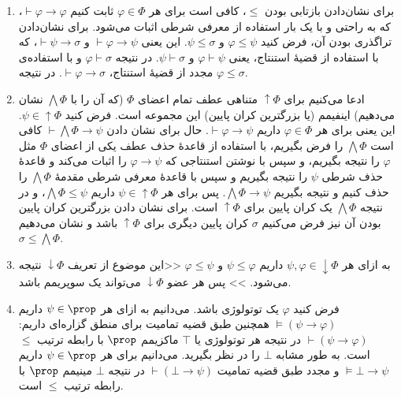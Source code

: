 \begin{ans}
    \begin{enumerate}[label=(\alph*)]
        \item\label{q60:a} برای نشان‌دادن بازتابی بودن $\leq$، کافی است برای هر $\varphi \in \Phi$ ثابت کنیم $\vdash \varphi \rightarrow \varphi$، که به راحتی و با یک بار استفاده از معرفی شرطی اثبات می‌شود.
        برای نشان‌دادن تراگذری بودن آن، فرض کنید
        $\varphi\leq\psi$
        و
        $\psi\leq\sigma$.
        این یعنی
        $\vdash\varphi\to\psi$
        و
        $\vdash\psi\to\sigma$، که با استفاده از قضیهٔ استنتاج، یعنی $\varphi\vdash\psi$ و $\psi\vdash\sigma$. در نتیجه $\varphi\vdash\sigma$ و با استفاده‌ی مجدد از قضیهٔ استنتاج، $\vdash\varphi\rightarrow\sigma$. در نتیجه $\varphi\leq\sigma$.
        
        \item\label{q60:b} ادعا می‌کنیم برای
        $\uparrow\Phi$
        متناهی عطف تمام اعضای
        $\Phi$
        (که آن را با
        $\bigwedge\Phi$
        نشان می‌دهیم)
        اینفیمم (یا بزرگترین کران پایین) این مجموعه است.
        فرض کنید
        $\psi\in\uparrow\Phi$.
        این یعنی برای هر
        $\varphi\in\Phi$
        داریم
        $\vdash\varphi\to\psi$.
        حال برای نشان دادن
        $\vdash\bigwedge\Phi\to\psi$
        کافی است
        $\bigwedge\Phi$
        را فرض بگیریم، با استفاده از قاعدهٔ حذف عطف یکی از اعضای
        $\Phi$
        مثل
        $\varphi$
        را نتیجه بگیریم، و سپس با نوشتن استنتاجی که
        $\varphi\to\psi$
        را اثبات می‌کند و قاعدهٔ حذف شرطی
        $\psi$
        را نتیجه بگیریم و سپس با قاعدهٔ معرفی شرطی مقدمهٔ
        $\bigwedge\Phi$
        را حذف کنیم و نتیجه بگیریم
        $\bigwedge\Phi\to\psi$. پس برای هر ‌$\psi\in\uparrow\Phi$ داریم $\bigwedge\Phi\leq\psi$، و در نتیجه $\bigwedge\Phi$ یک کران پایین برای $\uparrow\Phi$ است. برای نشان دادن بزرگترین کران پایین بودن آن نیز فرض می‌کنیم $\sigma$ کران پایین دیگری برای $\uparrow\Phi$ باشد و نشان می‌دهیم $\sigma\leq\bigwedge\Phi$.
        
        \item\label{q60:c} 
        به ازای هر 
        $\psi,\varphi\in\downarrow\Phi$
        داریم
        $\psi\leq\varphi$
        و
        $\varphi\leq\psi$
        <<این موضوع از تعریف 
        $\downarrow\Phi$
        نتیجه می‌شود. >>
        پس هر عضو 
        $\downarrow\Phi$
        می‌تواند یک سوپریمم باشد.
        
        \item\label{q60:d}  
        فرض کنید 
        $\varphi$
        یک توتولوژی باشد. 
        می‌دانیم به ازای هر 
        $\psi\in\prop$
        داریم
        $\models(\psi\to\varphi)$
        همچنین طبق قضیه تمامیت برای منطق گزاره‌ای داریم:
        $\vdash(\psi\to\varphi)$
        در نتیجه هر توتولوژی یا
        $\top$
        ماکزیمم 
        $\prop$
        با رابطه ترتیب 
        $\leq$
        است.
        به طور مشابه 
        $\bot$
        را در نظر بگیرید. 
        می‌دانیم برای هر 
        $\psi\in\prop$
        داریم 
        $\models\bot\to\psi$
        و مجدد طبق قضیه تمامیت
        $\vdash(\bot\to\psi)$
        در نتیجه 
        $\bot$
        مینیمم 
        $\prop$
        با رابطه ترتیب
        $\leq$
        است.


\end{enumerate}
\end{ans}

